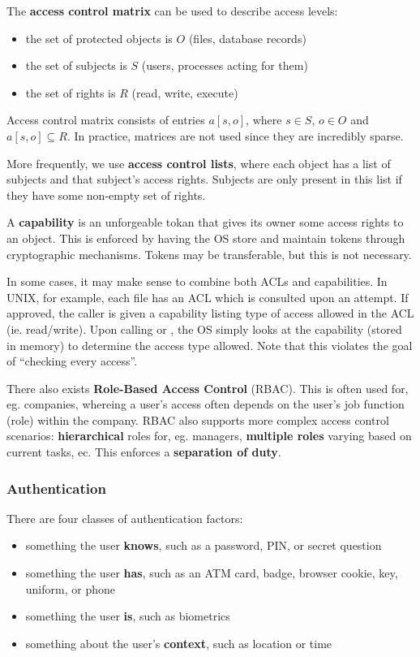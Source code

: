 \documentclass[12pt]{article}
\begin{document}
The {\bf access control matrix} can be used to describe access levels:
\begin{itemize}
\item the set of protected objects is $O$ (files, database records)
\item the set of subjects is $S$ (users, processes acting for them)
\item the set of rights is $R$ (read, write, execute)
\end{itemize}

Access control matrix consists of entries $a[s,o]$, where $s \in S$, $o \in O$ and $a[s,o] \subseteq R$. In practice, matrices are not used since they are incredibly sparse.

More frequently, we use {\bf access control lists}, where each object has a list of subjects and that subject's access rights. Subjects are only present in this list if they have some non-empty set of rights.

A {\bf capability} is an unforgeable tokan that gives its owner some access rights to an object. This is enforced by having the OS store and maintain tokens through cryptographic mechanisms. Tokens may be transferable, but this is not necessary.

In some cases, it may make sense to combine both ACLs and capabilities. In UNIX, for example, each file has an ACL which is consulted upon an  attempt. If approved, the caller is given a capability listing type of access allowed in the ACL (ie. read/write). Upon calling  or , the OS simply looks at the capability (stored in memory) to determine the access type allowed. Note that this violates the goal of ``checking every access''.

There also exists {\bf Role-Based Access Control} (RBAC). This is often used for, eg. companies, whereing a user's access often depends on the user's job function (role) within the company. RBAC also supports more complex access control scenarios: {\bf hierarchical} roles for, eg. managers, {\bf multiple roles} varying based on current tasks, ec. This enforces a {\bf separation of duty}.

\subsubsection{Authentication}
There are four classes of authentication factors:
\begin{itemize}
\item something the user {\bf knows}, such as a password, PIN, or secret question
\item something the user {\bf has}, such as an ATM card, badge, browser cookie, key, uniform, or phone
\item something the user {\bf is}, such as biometrics
\item something about the user's {\bf context}, such as location or time
\end{itemize}
\end{document}
